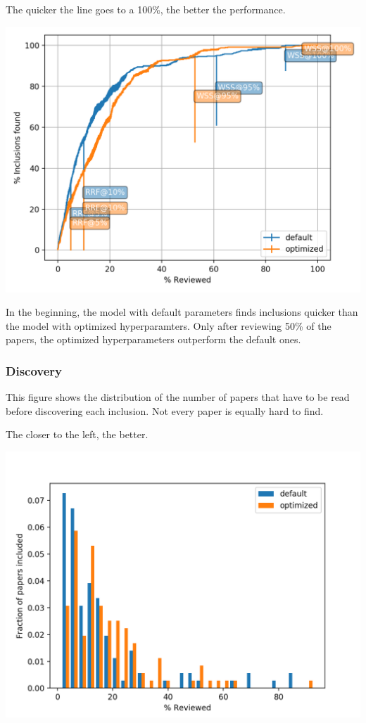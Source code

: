 \documentclass[
]{book}
\begin{document}
The quicker the line goes to a 100\%, the better the performance.

\includegraphics[width=17.78in]{figs/myfirstsim/Figure_1}

In the beginning, the model with default parameters finds inclusions quicker than the model with optimized hyperparamters.
Only after reviewing 50\% of the papers, the optimized hyperparameters outperform the default ones.

\pagebreak

\hypertarget{discovery}{%
\subsubsection{Discovery}\label{discovery}}

This figure shows the distribution of the number of papers that have to be read before discovering
each inclusion. Not every paper is equally hard to find.

The closer to the left, the better.

\includegraphics[width=17.78in]{figs/myfirstsim/Figure_2}
\end{document}
